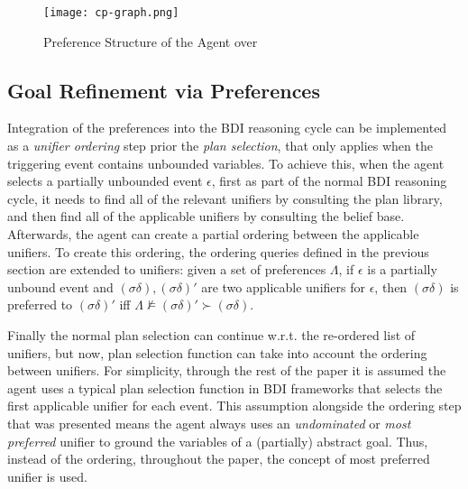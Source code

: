 \documentclass[sigconf,anonymous]{aamas}
\begin{document}
\begin{figure}[!tbh]
  \centering
  \texttt{[image: cp-graph.png]}
  \caption{Preference Structure of the Agent over }
  \label{fig:cp-graph}
\end{figure}

\subsection{Goal Refinement via Preferences}
Integration of the preferences into the BDI reasoning cycle can be implemented as a \textit{unifier ordering} step prior the \textit{plan selection}, that only applies when the triggering event contains unbounded variables. To achieve this, when the agent selects a partially unbounded event $\epsilon$, first as part of the normal BDI reasoning cycle, it needs to find all of the relevant unifiers by consulting the plan library, and then find all of the applicable unifiers by consulting the belief base. Afterwards, the agent can create a partial ordering between the applicable unifiers. To create this ordering, the ordering queries defined in the previous section are extended to unifiers: given a set of preferences $\Lambda$, if $\epsilon$ is a partially unbound event and $(\sigma\delta),(\sigma\delta)'$ are two applicable unifiers for $\epsilon$, then $(\sigma\delta)$ is preferred to $(\sigma\delta)'$ iff $\Lambda \not\models (\sigma\delta)' \succ (\sigma\delta)$.



Finally the normal plan selection can continue w.r.t. the re-ordered list of unifiers, but now, plan selection function can take into account the ordering between unifiers. For simplicity, through the rest of the paper it is assumed the agent uses a typical plan selection function in BDI frameworks that selects the first applicable unifier for each event. This assumption alongside the ordering step that was presented means the agent always uses an \textit{undominated} or \textit{most preferred} unifier to ground the variables of a (partially) abstract goal. Thus, instead of the ordering, throughout the paper, the concept of most preferred unifier is used. 
\end{document}
